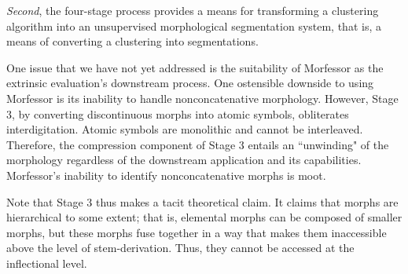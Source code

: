 \textit{Second}, the four-stage process provides a means for transforming a clustering algorithm into an unsupervised morphological segmentation system, that is, a means of converting a clustering into segmentations. %

One issue that we have not yet addressed is the suitability of Morfessor as the extrinsic evaluation's downstream process. 
One ostensible downside to using Morfessor is its inability to handle nonconcatenative morphology. However, Stage 3, by converting discontinuous morphs into atomic symbols, obliterates interdigitation.  Atomic symbols are monolithic and cannot be interleaved. 
Therefore, the compression component of Stage 3 entails an ``unwinding" of the morphology regardless of the downstream application and its capabilities. Morfessor’s inability to identify nonconcatenative morphs is moot.


Note that Stage 3 thus makes a tacit theoretical claim. It claims that morphs are hierarchical to some extent; that is, elemental morphs can be composed of smaller morphs, but these morphs fuse together in a way that makes them inaccessible above the level of stem-derivation. Thus, they cannot be accessed at the inflectional level. %

